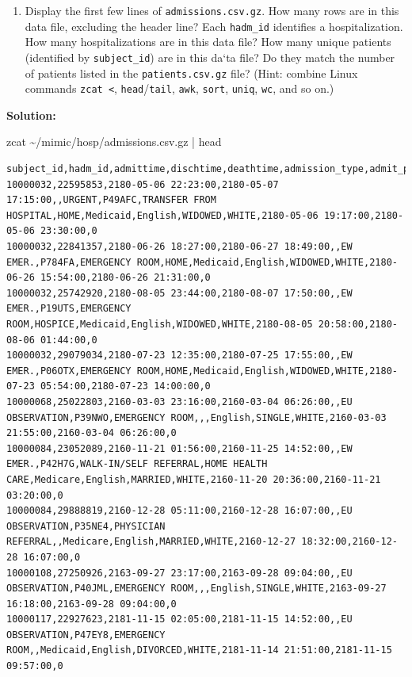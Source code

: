 \documentclass[
]{article}
\newenvironment{Shaded}{\begin{snugshade}}{\end{snugshade}}
\newcommand{\FunctionTok}[1]{\textcolor[rgb]{0.28,0.35,0.67}{#1}}
\newcommand{\KeywordTok}[1]{\textcolor[rgb]{0.00,0.23,0.31}{#1}}
\newcommand{\NormalTok}[1]{\textcolor[rgb]{0.00,0.23,0.31}{#1}}
\providecommand{\tightlist}{%
  \setlength{\itemsep}{0pt}\setlength{\parskip}{0pt}}\usepackage{longtable,booktabs,array}
\begin{document}
\begin{enumerate}
\def\labelenumi{\arabic{enumi}.}
\setcounter{enumi}{4}
\tightlist
\item
  Display the first few lines of \texttt{admissions.csv.gz}. How many
  rows are in this data file, excluding the header line? Each
  \texttt{hadm\_id} identifies a hospitalization. How many
  hospitalizations are in this data file? How many unique patients
  (identified by \texttt{subject\_id}) are in this da`ta file? Do they
  match the number of patients listed in the \texttt{patients.csv.gz}
  file? (Hint: combine Linux commands \texttt{zcat\ \textless{}},
  \texttt{head}/\texttt{tail}, \texttt{awk}, \texttt{sort},
  \texttt{uniq}, \texttt{wc}, and so on.)
\end{enumerate}

\textbf{Solution:}

\begin{Shaded}
\begin{Highlighting}[]
\FunctionTok{zcat}\NormalTok{ \textasciitilde{}/mimic/hosp/admissions.csv.gz }\KeywordTok{|} \FunctionTok{head}
\end{Highlighting}
\end{Shaded}

\begin{verbatim}
subject_id,hadm_id,admittime,dischtime,deathtime,admission_type,admit_provider_id,admission_location,discharge_location,insurance,language,marital_status,race,edregtime,edouttime,hospital_expire_flag
10000032,22595853,2180-05-06 22:23:00,2180-05-07 17:15:00,,URGENT,P49AFC,TRANSFER FROM HOSPITAL,HOME,Medicaid,English,WIDOWED,WHITE,2180-05-06 19:17:00,2180-05-06 23:30:00,0
10000032,22841357,2180-06-26 18:27:00,2180-06-27 18:49:00,,EW EMER.,P784FA,EMERGENCY ROOM,HOME,Medicaid,English,WIDOWED,WHITE,2180-06-26 15:54:00,2180-06-26 21:31:00,0
10000032,25742920,2180-08-05 23:44:00,2180-08-07 17:50:00,,EW EMER.,P19UTS,EMERGENCY ROOM,HOSPICE,Medicaid,English,WIDOWED,WHITE,2180-08-05 20:58:00,2180-08-06 01:44:00,0
10000032,29079034,2180-07-23 12:35:00,2180-07-25 17:55:00,,EW EMER.,P06OTX,EMERGENCY ROOM,HOME,Medicaid,English,WIDOWED,WHITE,2180-07-23 05:54:00,2180-07-23 14:00:00,0
10000068,25022803,2160-03-03 23:16:00,2160-03-04 06:26:00,,EU OBSERVATION,P39NWO,EMERGENCY ROOM,,,English,SINGLE,WHITE,2160-03-03 21:55:00,2160-03-04 06:26:00,0
10000084,23052089,2160-11-21 01:56:00,2160-11-25 14:52:00,,EW EMER.,P42H7G,WALK-IN/SELF REFERRAL,HOME HEALTH CARE,Medicare,English,MARRIED,WHITE,2160-11-20 20:36:00,2160-11-21 03:20:00,0
10000084,29888819,2160-12-28 05:11:00,2160-12-28 16:07:00,,EU OBSERVATION,P35NE4,PHYSICIAN REFERRAL,,Medicare,English,MARRIED,WHITE,2160-12-27 18:32:00,2160-12-28 16:07:00,0
10000108,27250926,2163-09-27 23:17:00,2163-09-28 09:04:00,,EU OBSERVATION,P40JML,EMERGENCY ROOM,,,English,SINGLE,WHITE,2163-09-27 16:18:00,2163-09-28 09:04:00,0
10000117,22927623,2181-11-15 02:05:00,2181-11-15 14:52:00,,EU OBSERVATION,P47EY8,EMERGENCY ROOM,,Medicaid,English,DIVORCED,WHITE,2181-11-14 21:51:00,2181-11-15 09:57:00,0
\end{verbatim}
\end{document}
